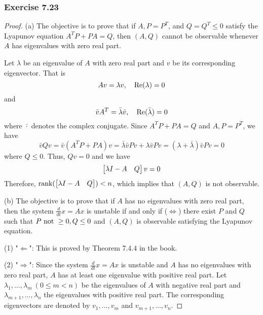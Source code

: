\subsubsection{Exercise 7.23}
\begin{proof}
    
(a) The objective is to prove that if $A,P=P^T$, and $Q=Q^T\leq 0$ satisfy the Lyapunov equation $A^TP+PA = Q$, then $(A,Q)$ cannot be observable whenever $A$ has eigenvalues with zero real part.

Let $\lambda$ be an eigenvalue of $A$ with zero real part and $v$ be its corresponding eigenvector. That is 
\begin{equation}
    Av = \lambda v, \quad \textnormal{Re}(\lambda) = 0
\end{equation}
and
\begin{equation}
    \bar{v}A^T = \bar{\lambda}\bar{v}, \quad \textnormal{Re}(\bar\lambda) = 0
\end{equation}
where $\bar{\cdot}$ denotes the complex conjugate. Since $A^TP+PA = Q$ and $A,P=P^T$, we have
\begin{equation}
    \bar{v}Qv = \bar{v}(A^TP+PA)v = \bar{\lambda}\bar{v}Pv + \lambda\bar{v}Pv = (\lambda + \bar{\lambda})\bar{v}Pv = 0
\end{equation}
where $Q\leq 0$. Thus, $Qv=0$ and we have
\begin{equation}
    \begin{bmatrix} \lambda I-A &Q \end{bmatrix} v = 0
\end{equation}
Therefore, $\textnormal{rank}(\begin{bmatrix} \lambda I-A &Q \end{bmatrix})<n$, which implies that $(A,Q)$ is not observable.

(b) The objective is to prove that if $A$ has no eigenvalues with zero real part, then the system $\frac{d}{dt}x = Ax$ is unstable if and only if ($\iff$) there exist $P$ and $Q$ such that $P \textnormal{ not } \geq 0, Q\leq 0$ and $(A,Q)$ is observable satisfying the Lyapunov equation.

(1) "$\Leftarrow$": This is proved by Theorem 7.4.4 in the book.

(2) "$\Rightarrow$": Since the system $\frac{d}{dt}x = Ax$ is unstable and $A$ has no eigenvalues with zero real part, $A$ has at least one eigenvalue with positive real part. Let $\lambda_1,\dots,\lambda_m ~(0\leq m< n)$ be the eigenvalues of $A$ with negative real part and $\lambda_{m+1},\dots,\lambda_n$ the eigenvalues with positive real part. The corresponding eigenvectors are denoted by $v_1,\dots,v_m$ and $v_{m+1},\dots,v_n$. 


\end{proof}
